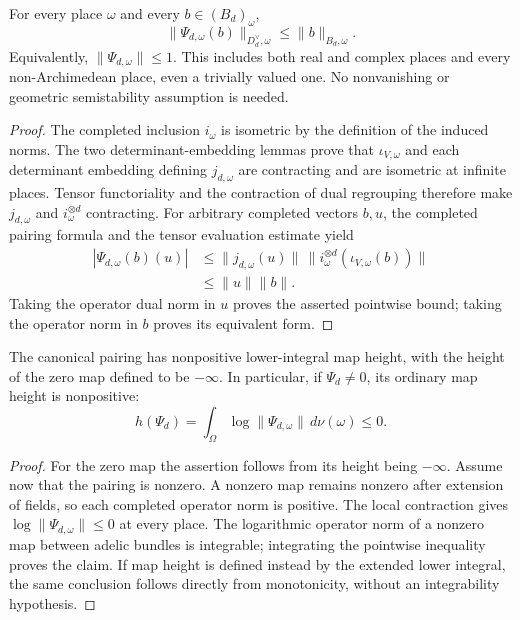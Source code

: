 \begin{lemma}
\label{lem:local-pairing-contraction}
\leanok
For every place $\omega$ and every $b\in(B_d)_\omega$,
\[
 \|\Psi_{d,\omega}(b)\|_{D_d^\vee,\omega}\leq\|b\|_{B_d,\omega}.
\]
Equivalently, $\|\Psi_{d,\omega}\|\leq1$. This includes both real and
complex places and every non-Archimedean place, even a trivially valued one.
No nonvanishing or geometric semistability assumption is needed.
\end{lemma}
\begin{proof}
The completed inclusion $i_\omega$ is isometric by the definition of the
induced norms. The two determinant-embedding lemmas prove that
$\iota_{V,\omega}$ and each determinant embedding defining $j_{d,\omega}$
are contracting and are isometric at infinite places. Tensor functoriality
and the contraction of dual regrouping
therefore make $j_{d,\omega}$ and $i_\omega^{\otimes d}$ contracting.
For arbitrary completed vectors $b,u$, the completed pairing formula and
the tensor evaluation estimate yield
\[
 \begin{aligned}
 |\Psi_{d,\omega}(b)(u)|
 &\leq\|j_{d,\omega}(u)\|\,
       \|i_\omega^{\otimes d}(\iota_{V,\omega}(b))\|\\
 &\leq\|u\|\|b\|.
 \end{aligned}
\]
Taking the operator dual norm in $u$ proves the asserted pointwise bound;
taking the operator norm in $b$ proves its equivalent form.
\end{proof}

\begin{corollary}
\label{cor:canonical-pairing-height}
\leanok
The canonical pairing has nonpositive lower-integral map height, with the
height of the zero map defined to be $-\infty$. In particular, if
$\Psi_d\neq0$, its ordinary map height is nonpositive:
\[
 h(\Psi_d)=\int_\Omega\log\|\Psi_{d,\omega}\|\,d\nu(\omega)\leq0.
\]
\end{corollary}
\begin{proof}
For the zero map the assertion follows from its height being $-\infty$.
Assume now that the pairing is nonzero. A nonzero map remains nonzero after
extension of fields, so each completed
operator norm is positive. The local contraction gives
$\log\|\Psi_{d,\omega}\|\leq0$ at every place. The logarithmic operator
norm of a nonzero map between adelic bundles is integrable; integrating the
pointwise inequality proves the claim. If map height is defined instead by
the extended lower integral, the same conclusion follows directly from
monotonicity, without an integrability hypothesis.
\end{proof}
